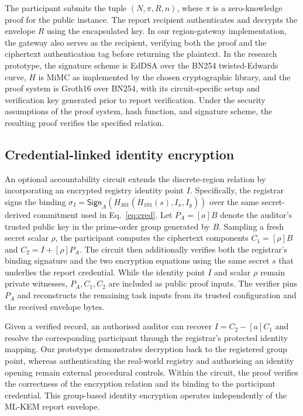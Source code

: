 \documentclass[pdflatex,iicol,sn-mathphys-num]{sn-jnl}
\begin{document}
The participant submits the tuple $(N,\pi,R,n)$, where $\pi$ is a zero-knowledge proof for the public instance. The report recipient authenticates and decrypts the envelope $R$ using the encapsulated key. In our region-gateway implementation, the gateway also serves as the recipient, verifying both the proof and the ciphertext authentication tag before returning the plaintext. In the research prototype, the signature scheme is EdDSA over the BN254 twisted-Edwards curve, $H$ is MiMC as implemented by the chosen cryptographic library, and the proof system is Groth16 over BN254, with its circuit-specific setup and verification key generated prior to report verification. Under the security assumptions of the proof system, hash function, and signature scheme, the resulting proof verifies the specified relation.

\subsection{Credential-linked identity encryption}
An optional accountability circuit extends the discrete-region relation by incorporating an encrypted registry identity point $I$. Specifically, the registrar signs the binding $\sigma_I=\mathsf{Sign}_A(H_{301}(H_{101}(s),I_x,I_y))$ over the same secret-derived commitment used in Eq.~\eqref{eq:cred}. Let $P_A=[a]B$ denote the auditor's trusted public key in the prime-order group generated by $B$. Sampling a fresh secret scalar $\rho$, the participant computes the ciphertext components $C_1=[\rho]B$ and $C_2=I+[\rho]P_A$. The circuit then additionally verifies both the registrar's binding signature and the two encryption equations using the same secret $s$ that underlies the report credential. While the identity point $I$ and scalar $\rho$ remain private witnesses, $P_A,C_1,C_2$ are included as public proof inputs. The verifier pins $P_A$ and reconstructs the remaining task inputs from its trusted configuration and the received envelope bytes.

Given a verified record, an authorised auditor can recover $I=C_2-[a]C_1$ and resolve the corresponding participant through the registrar's protected identity mapping. Our prototype demonstrates decryption back to the registered group point, whereas authenticating the real-world registry and authorising an identity opening remain external procedural controls. Within the circuit, the proof verifies the correctness of the encryption relation and its binding to the participant credential. This group-based identity encryption operates independently of the ML-KEM report envelope.
\end{document}
